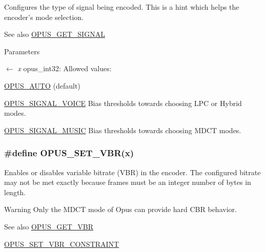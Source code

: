 Configures the type of signal being encoded. This is a hint which helps the encoder's mode selection. \begin{DoxySeeAlso}{See also}
\hyperlink{group__opus__encoderctls_ga640d434de535e2d2caec991c347303a4}{OPUS\_\-GET\_\-SIGNAL} 
\end{DoxySeeAlso}

\begin{DoxyParams}{Parameters}
\item[\mbox{$\leftarrow$} {\em x}]{\ttfamily opus\_\-int32}: Allowed values: 
\begin{DoxyDescription}
\item[\hyperlink{group__opus__ctlvalues_ga1c5b3244b018ff4548d2d6bffa418472}{OPUS\_\-AUTO} ](default) 
\item[\hyperlink{group__opus__ctlvalues_ga085a116fed816373d3b9eae28df49404}{OPUS\_\-SIGNAL\_\-VOICE}]Bias thresholds towards choosing LPC or Hybrid modes. 
\item[\hyperlink{group__opus__ctlvalues_gaa0c228c664b6d426f4c213e3a5350889}{OPUS\_\-SIGNAL\_\-MUSIC}]Bias thresholds towards choosing MDCT modes. 
\end{DoxyDescription}\end{DoxyParams}
\hypertarget{group__opus__encoderctls_ga34d09ae06cab7e1a6c49876249b67892}{
\subsubsection[{OPUS\_\-SET\_\-VBR}]{\setlength{\rightskip}{0pt plus 5cm}\#define OPUS\_\-SET\_\-VBR(x)}}
\label{group__opus__encoderctls_ga34d09ae06cab7e1a6c49876249b67892}


Enables or disables variable bitrate (VBR) in the encoder. The configured bitrate may not be met exactly because frames must be an integer number of bytes in length. \begin{DoxyWarning}{Warning}
Only the MDCT mode of Opus can provide hard CBR behavior. 
\end{DoxyWarning}
\begin{DoxySeeAlso}{See also}
\hyperlink{group__opus__encoderctls_ga58feba30c167962305ec268e6abe8c08}{OPUS\_\-GET\_\-VBR} 

\hyperlink{group__opus__encoderctls_gab1b534a4fe55373f1be407ad4b2b22bd}{OPUS\_\-SET\_\-VBR\_\-CONSTRAINT} 
\end{DoxySeeAlso}

